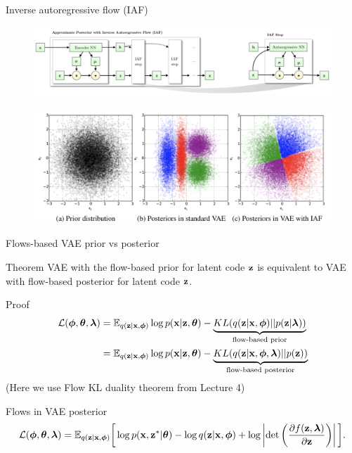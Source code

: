 \begin{frame}{Inverse autoregressive flow (IAF)}
	\begin{figure}
		\includegraphics[width=\linewidth]{figs/iaf2.png}
	\end{figure}
	\begin{figure}
		\includegraphics[width=\linewidth]{figs/iaf1.png}
	\end{figure}

\end{frame}
\begin{frame}{Flows-based VAE prior vs posterior}
	\begin{block}{Theorem}
	VAE with the flow-based prior for latent code $\mathbf{z}$ is equivalent to VAE with flow-based posterior for latent code $\mathbf{z}$.
	\end{block}
	\begin{block}{Proof}
	\vspace{-0.5cm}
	\begin{align*}
		\mathcal{L}(\boldsymbol{\phi}, \boldsymbol{\theta}, \boldsymbol{\lambda}) &= \mathbb{E}_{q(\mathbf{z} | \mathbf{x}, \boldsymbol{\phi})} \log p(\mathbf{x} | \mathbf{z}, \boldsymbol{\theta}) - \underbrace{KL( q(\mathbf{z} | \mathbf{x}, \boldsymbol{\phi}) || p(\mathbf{z} | \boldsymbol{\lambda}))}_{\text{flow-based prior}} \\
		& = \mathbb{E}_{q(\mathbf{z} | \mathbf{x}, \boldsymbol{\phi})} \log p(\mathbf{x} | \mathbf{z}, \boldsymbol{\theta}) - \underbrace{KL( q(\mathbf{z} | \mathbf{x}, \boldsymbol{\phi}, \boldsymbol{\lambda}) || p(\mathbf{z}))}_{\text{flow-based posterior}}
	\end{align*}
	(Here we use Flow KL duality theorem from Lecture 4)
	\end{block}
	\begin{block}{Flows in VAE posterior}
		\vspace{-0.3cm}
		{\small
		\[
			\mathcal{L} (\boldsymbol{\phi}, \boldsymbol{\theta}, \boldsymbol{\lambda}) 
			= \mathbb{E}_{q(\mathbf{z} | \mathbf{x}, \boldsymbol{\phi})} \bigg[\log p(\mathbf{x}, \mathbf{z}^* | \boldsymbol{\theta}) -  \log q(\mathbf{z} | \mathbf{x}, \boldsymbol{\phi} ) +   \log \left| \det \left( \frac{\partial f(\mathbf{z}, \boldsymbol{\lambda})}{\partial \mathbf{z}} \right) \right| \bigg].
		\]
		}
	\end{block}
\end{frame}
